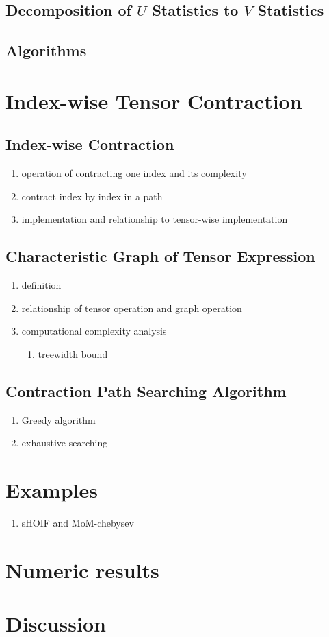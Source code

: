 \documentclass[letterpaper,11pt]{article}
\newcommand{\pdfu}{\texorpdfstring{$U$}{U}}
\newcommand{\pdfv}{\texorpdfstring{$V$}{V}}
\begin{document}
\subsection{Decomposition of \pdfu{} Statistics to \pdfv{} Statistics}
\subsection{Algorithms}
\section{Index-wise Tensor Contraction}
\subsection{Index-wise Contraction}
\begin{enumerate}
    \item operation of contracting one index and its complexity
    \item contract index by index in a path
    \item implementation and relationship to tensor-wise implementation
\end{enumerate}

\subsection{Characteristic Graph of Tensor Expression}
\begin{enumerate}
    \item definition
    \item relationship of tensor operation and graph operation
    \item computational complexity analysis
     \begin{enumerate}[label=\alph*)]
        \item treewidth bound 
    \end{enumerate}
    
\end{enumerate}
\subsection{Contraction Path Searching Algorithm}
\begin{enumerate}
    \item Greedy algorithm
    \item exhaustive searching
\end{enumerate}

\section{Examples}
\begin{enumerate}
    \item sHOIF and MoM-chebysev
\end{enumerate}

\section{Numeric results}

\section{Discussion}
\end{document}
